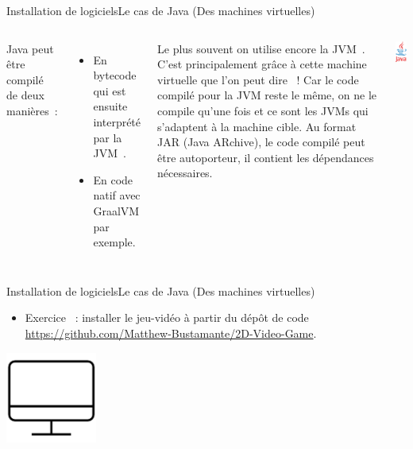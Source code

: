 \documentclass{beamer}
\begin{document}
    \begin{frame}{Installation de logiciels}{Le cas de Java (Des machines virtuelles)}
        \begin{columns}
            Java peut être compilé de deux manières~:
            \begin{itemize}
                \item En bytecode qui est ensuite interprété par la JVM~.
                \item En code natif avec GraalVM par exemple.
            \end{itemize}
            Le plus souvent on utilise encore la JVM~.
            C'est principalement grâce à cette machine virtuelle que l'on peut dire ~!
            \bigbreak
            Car le code compilé pour la JVM reste le même, on ne le compile qu'une fois et ce sont les JVMs qui s'adaptent à la machine cible.
            Au format JAR (Java ARchive), le code compilé peut être autoporteur, il contient les dépendances nécessaires.
            \begin{center}
                \includegraphics[width=3cm]{image/java-logo}
            \end{center}
        \end{columns}
    \end{frame}

    \begin{frame}{Installation de logiciels}{Le cas de Java (Des machines virtuelles)}
        \begin{itemize}
            \item Exercice \execcounterdispinc{}~: installer le jeu-vidéo à partir du dépôt de code \url{https://github.com/Matthew-Bustamante/2D-Video-Game}.
        \end{itemize}
        \bigbreak
        \centering
        \includegraphics[width=3cm]{image/desktop}
    \end{frame}
\end{document}
